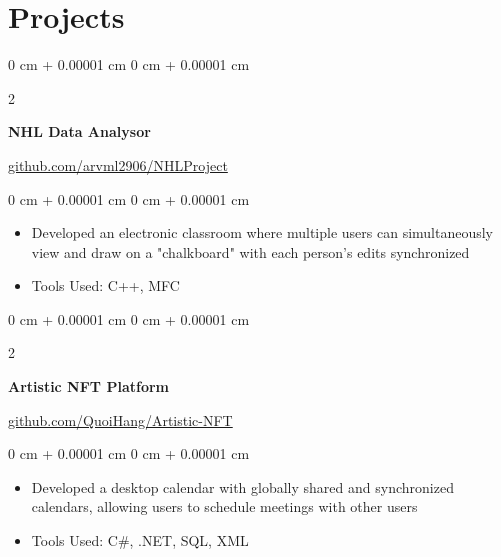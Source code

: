 \documentclass[10pt, letterpaper]{article}
\newenvironment{highlights}{
    \begin{itemize}[
        topsep=0.10 cm,
        parsep=0.10 cm,
        partopsep=0pt,
        itemsep=0pt,
        leftmargin=0 cm + 10pt
    ]
}{
    \end{itemize}
} %
\newenvironment{onecolentry}{
    \begin{adjustwidth}{
        0 cm + 0.00001 cm
    }{
        0 cm + 0.00001 cm
    }
}{
    \end{adjustwidth}
} %
\newenvironment{twocolentry}[2][]{
    \onecolentry
    \def\secondColumn{#2}
    \setcolumnwidth{\fill, 6.5 cm}
    \begin{paracol}{2}
}{
    \switchcolumn \raggedleft \secondColumn
    \end{paracol}
    \endonecolentry
} %
\begin{document}
            

                

    \section{Projects}
        \begin{twocolentry}{
            \href{https://github.com/arvml2906/NHLProject}{github.com/arvml2906/NHLProject}
        }
            \textbf{NHL Data Analysor}
        \end{twocolentry}

        \vspace{0.10 cm}
        \begin{onecolentry}
            \begin{highlights}
                \item Developed an electronic classroom where multiple users can simultaneously view and draw on a "chalkboard" with each person's edits synchronized
                \item Tools Used: C++, MFC
            \end{highlights}
        \end{onecolentry}


        \vspace{0.2 cm}

        \begin{twocolentry}{
            \href{https://github.com/QuoiHang/Artistic-NFT}{github.com/QuoiHang/Artistic-NFT}
        }
            \textbf{Artistic NFT Platform}
        \end{twocolentry}

        \vspace{0.10 cm}
        \begin{onecolentry}
            \begin{highlights}
                \item Developed a desktop calendar with globally shared and synchronized calendars, allowing users to schedule meetings with other users
                \item Tools Used: C\#, .NET, SQL, XML
            \end{highlights}
        \end{onecolentry}
\end{document}
